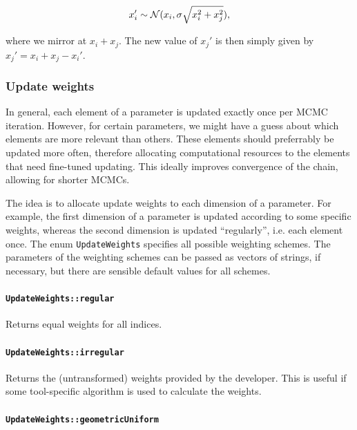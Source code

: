 \documentclass[a4paper,11pt]{article}
\newcommand{\enum}[1]{\texttt{#1}}
\begin{document}
\begin{equation*}
 x_i' \sim {\cal N}(x_i, \sigma \sqrt{x_i^2 + x_j^2}),
\end{equation*}

where we mirror at $x_i + x_j$. The new value of $x_j'$ is then simply given by $x_j' = x_i + x_j - x_i'$.

\subsubsection{Update weights}

In general, each element of a parameter is updated exactly once per MCMC iteration. However, for certain parameters, we might have a guess about which elements are more relevant than others. These elements should preferrably be updated more often, therefore allocating computational resources to the elements that need fine-tuned updating. This ideally improves convergence of the chain, allowing for shorter MCMCs.

The idea is to allocate update weights to each dimension of a parameter. For example, the first dimension of a parameter is updated according to some specific weights, whereas the second dimension is updated ``regularly'', i.e. each element once. The enum \enum{UpdateWeights} specifies all possible weighting schemes. The parameters of the weighting schemes can be passed as vectors of strings, if necessary, but there are sensible default values for all schemes.

\paragraph{\enum{UpdateWeights::regular}}

Returns equal weights for all indices.

\paragraph{\enum{UpdateWeights::irregular}}

Returns the (untransformed) weights provided by the developer. This is useful if some tool-specific algorithm is used to calculate the weights.

\paragraph{\enum{UpdateWeights::geometricUniform}}
\end{document}
